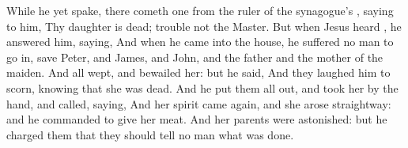 {While
he
yet
spake, there
cometh
one
from the ruler of the
synagogue’s
{},
saying to
him,
Thy
daughter is
dead;
trouble
not the
Master.
But
when
Jesus
heard
{}, he
answered
him,
saying,
{}
And when he
came
into the
house, he
suffered
no
man to go
in,
save
Peter,
and
James,
and
John,
and the
father
and the
mother of the
maiden.
And
all
wept,
and
bewailed
her:
but he
said,
{}
And they
laughed
him to
scorn,
knowing
that she was
dead.
And
he put
them
all
out,
and
took
her by the
hand, and
called,
saying,
{}
And
her
spirit came
again,
and she
arose
straightway:
and he
commanded to
give
her
meat.
And
her
parents were
astonished:
but he
charged
them that they should
tell no
man what was
done.

}
